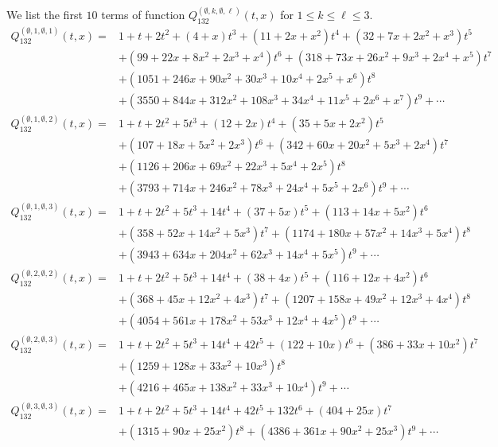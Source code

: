\documentclass[
final,nomarks
]{dmtcs-episciences}
\newcommand{\Qmm}[1]{Q_{132}^{(#1)}(t,x)}
\begin{document}
We list the first \begin{math}10\end{math} terms of function \begin{math}\Qmm{\emptyset,k,\emptyset,\ell}\end{math} for \begin{math}1\leq k\leq \ell\leq 3\end{math}.
\begin{align}
\Qmm{\emptyset,1,\emptyset,1}=&1+t+2 t^2+(4+x) t^3+\left(11+2 x+x^2\right) t^4+\left(32+7 x+2 x^2+x^3\right)
t^5\nonumber\\\nonumber
&+\left(99+22 x+8 x^2+2 x^3+x^4\right) t^6+\left(318+73 x+26 x^2+9 x^3+2
x^4+x^5\right) t^7\\\nonumber
&+\left(1051+246 x+90 x^2+30 x^3+10 x^4+2 x^5+x^6\right)
t^8\\
&+\left(3550+844 x+312 x^2+108 x^3+34 x^4+11 x^5+2 x^6+x^7\right)
t^9+\cdots
\\
\Qmm{\emptyset,1,\emptyset,2}=&1+t+2 t^2+5 t^3+(12+2 x) t^4+\left(35+5 x+2 x^2\right) t^5\nonumber\\\nonumber
&+\left(107+18 x+5
x^2+2 x^3\right) t^6+\left(342+60 x+20 x^2+5 x^3+2 x^4\right)
t^7\\\nonumber
&+\left(1126+206 x+69 x^2+22 x^3+5 x^4+2 x^5\right) t^8\\
&+\left(3793+714
x+246 x^2+78 x^3+24 x^4+5 x^5+2 x^6\right) t^9+\cdots
\\
\Qmm{\emptyset,1,\emptyset,3}=&1+t+2 t^2+5 t^3+14 t^4+(37+5 x) t^5+\left(113+14 x+5 x^2\right)
t^6\nonumber\\\nonumber
&+\left(358+52 x+14 x^2+5 x^3\right) t^7+\left(1174+180 x+57 x^2+14 x^3+5
x^4\right) t^8\\
&+\left(3943+634 x+204 x^2+62 x^3+14 x^4+5 x^5\right)
t^9+\cdots
\\
\Qmm{\emptyset,2,\emptyset,2}=&1+t+2 t^2+5 t^3+14 t^4+(38+4 x) t^5+\left(116+12 x+4 x^2\right)
t^6\nonumber\\\nonumber
&+\left(368+45 x+12 x^2+4 x^3\right) t^7+\left(1207+158 x+49 x^2+12 x^3+4
x^4\right) t^8\\
&+\left(4054+561 x+178 x^2+53 x^3+12 x^4+4 x^5\right)
t^9+\cdots
\\
\Qmm{\emptyset,2,\emptyset,3}=&1+t+2 t^2+5 t^3+14 t^4+42 t^5+(122+10 x) t^6+\left(386+33 x+10 x^2\right)
t^7\nonumber\\
&+\left(1259+128 x+33 x^2+10 x^3\right) t^8\\\nonumber
&+\left(4216+465 x+138 x^2+33
x^3+10 x^4\right) t^9+\cdots
\\
\Qmm{\emptyset,3,\emptyset,3}=&1+t+2 t^2+5 t^3+14 t^4+42 t^5+132 t^6+(404+25 x) t^7\nonumber\\
&+\left(1315+90 x+25
x^2\right) t^8+\left(4386+361 x+90 x^2+25 x^3\right)
t^9+\cdots
\end{align}
\end{document}
